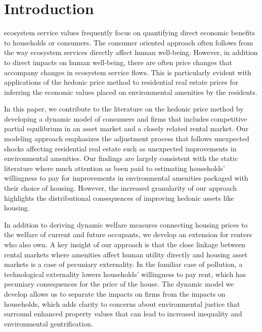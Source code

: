 \documentclass[ecta,nameyear,draft]{econsocart}
\theoremstyle{plain}
\theoremstyle{remark}
\begin{document}

\section{Introduction}

 ecosystem service values frequently focus on quantifying direct economic benefits to households or consumers. The consumer oriented approach often follows from the way ecosystem services directly affect human well-being. However, in addition to direct impacts on human well-being, there are often price changes that accompany changes in ecosystem service flows. This is particularly evident with applications of the hedonic price method to residential real estate prices for inferring the economic values placed on environmental amenities by the residents.

In this paper, we contribute to the literature on the hedonic price method by developing a dynamic model of consumers and firms that includes competitive partial equilibrium in an asset market and a closely related rental market. Our modeling approach emphasizes the adjustment process that follows unexpected shocks affecting residential real estate such as unexpected improvements in environmental amenities. Our findings are largely consistent with the static literature where much attention as been paid to estimating households' willingness to pay for improvements in environmental amenities packaged with their choice of housing. However, the increased granularity of our approach highlights the distributional consequences of improving hedonic assets like housing. 

In addition to deriving dynamic welfare measures connecting housing prices to the welfare of current and future occupants, we develop an extension for renters who also own. A key insight of our approach is that the close linkage between rental markets where amenities affect human utility directly and housing asset markets is a case of pecuniary externality. In the familiar case of pollution, a technological externality lowers households' willingness to pay rent, which has pecuniary consequences for the price of the house. The dynamic model we develop allows us to separate the impacts on firms from the impacts on households, which adds clarity to concerns about environmental justice that surround enhanced property values that can lead to increased inequality and environmental gentrification.
\end{document}
